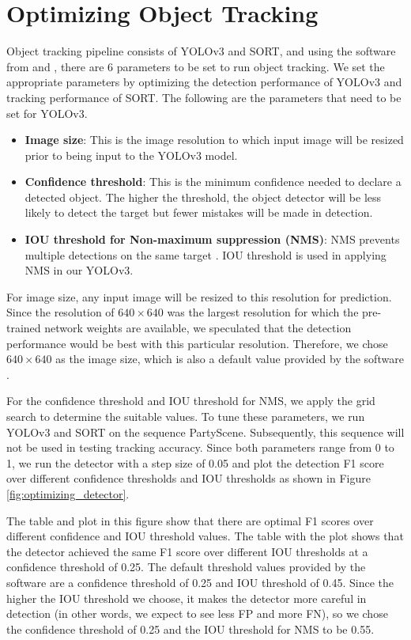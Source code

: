 \section{Optimizing Object Tracking}
\label{sec:methods/section_b}

Object tracking pipeline consists of YOLOv3 and SORT, and using the software from \cite{jocher_ultralyticsyolov3_2021} and \cite{abewley_abewleysort_2021}, there are 6 parameters to be set to run object tracking. We set the appropriate parameters by optimizing the detection performance of YOLOv3 and tracking performance of SORT. The following are the parameters that need to be set for YOLOv3.
\begin{itemize}
    \item \textbf{Image size}: This is the image resolution to which input image will be resized prior to being input to the YOLOv3 model.
    \item \textbf{Confidence threshold}: This is the minimum confidence needed to declare a detected object. The higher the threshold, the object detector will be less likely to detect the target but fewer mistakes will be made in detection.
    \item \textbf{IOU threshold for Non-maximum suppression (NMS)}: NMS prevents multiple detections on the same target \cite{redmon_you_2016}. IOU threshold is used in applying NMS in our YOLOv3.
\end{itemize}
For image size, any input image will be resized to this resolution for prediction. Since the resolution of $640\times640$ was the largest resolution for which the pre-trained network weights are available, we speculated that the detection performance would be best with this particular resolution. Therefore, we chose $640\times 640$ as the image size, which is also a default value provided by the software \cite{jocher_ultralyticsyolov3_2021}.

For the confidence threshold and IOU threshold for NMS, we apply the grid search to determine the suitable values. To tune these parameters, we run YOLOv3 and SORT on the sequence PartyScene. Subsequently, this sequence will not be used in testing tracking accuracy. Since both parameters range from 0 to 1, we run the detector with a step size of 0.05 and plot the detection F1 score over different confidence thresholds and IOU thresholds as shown in Figure \ref{fig:optimizing_detector}.

The table and plot in this figure show that there are optimal F1 scores over different confidence and IOU threshold values. The table with the plot shows that the detector achieved the same F1 score over different IOU thresholds at a confidence threshold of 0.25. The default threshold values provided by the software \cite{jocher_ultralyticsyolov3_2021} are a confidence threshold of 0.25 and IOU threshold of 0.45. Since the higher the IOU threshold we choose, it makes the detector more careful in detection (in other words, we expect to see less FP and more FN), so we chose the confidence threshold of 0.25 and the IOU threshold for NMS to be 0.55.

